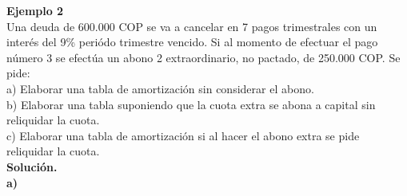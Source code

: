 \textbf{Ejemplo 2 }\\
Una deuda de  600.000 COP se va a cancelar en 7 pagos trimestrales con un interés del 9\% periódo trimestre vencido. Si al momento de efectuar el pago número 3 se efectúa un abono 2 extraordinario, no pactado, de 250.000 COP. Se pide: \\
a) Elaborar una tabla de amortización sin considerar el abono.\\
b) Elaborar una tabla suponiendo que la cuota extra se abona a capital sin reliquidar la cuota. \\
c) Elaborar una tabla de amortización si al hacer el abono extra se pide reliquidar la cuota.\\

\textbf{Solución.\\ a) }\\
